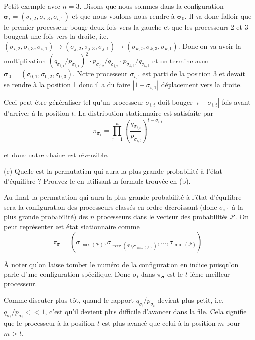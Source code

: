 \documentclass{article}
\begin{document}
Petit exemple avec $n=3$. Disons que nous sommes dans la configuration $\boldsymbol{\sigma}_i=(\sigma_{i,2},\sigma_{i,3},\sigma_{i,1})$ 
et que nous voulons nous rendre à $\boldsymbol{\sigma}_0$. Il va donc falloir que le premier processeur bouge deux fois vers la gauche
et que les processeurs 2 et 3 bougent une fois vers la droite, i.e. $(\sigma_{i,2},\sigma_{i,3},\sigma_{i,1})\to(\sigma_{j,2},\sigma_{j,3},\sigma_{j,1})\to(\sigma_{k,2},\sigma_{k,3},\sigma_{k,1})$. 
Donc on va avoir la multiplication $(q_{\sigma_{i,1}}/p_{\sigma_{i,1}})^2\cdot p_{\sigma_{j,2}}/q_{\sigma_{j,2}}\cdot p_{\sigma_{k,3}}/q_{\sigma_{k,3}}$ 
et on termine avec $\boldsymbol{\sigma}_0=(\sigma_{0,1},\sigma_{0,2},\sigma_{0,3})$. Notre processeur $\sigma_{i,1}$ 
est parti de la position 3 et devait se rendre à la position 1 donc il a du faire $|1-\sigma_{i,1}|$ déplacement vers la droite.

\vspace{.2cm}
Ceci peut être généraliser tel qu'un processeur $\sigma_{i,t}$ doit bouger $|t-\sigma_{i,t}|$ fois avant 
d'arriver à la position $t$. La distribution stationnaire est satisfaite par
\begin{equation}
    \pi_{\boldsymbol{\sigma}_i}=\prod_{t=1}^n \left(\frac{q_{\sigma_{i,t}}}{p_{\sigma_{i,t}}}\right)^{t-\sigma_{i,t}}
\end{equation}

et donc notre chaîne est réversible.

\vspace{.5cm}
\noindent (c) Quelle est la permutation qui aura la plus grande 
probabilité à l'état d'équilibre ? Prouvez-le en utilisant la formule
trouvée en (b).

\vspace{.2cm}
Au final, la permutation qui aura la plus grande probabilité à l'état d'équilibre sera
la configuration des processeurs classés en ordre décroissant (donc $\sigma_{i,1}$ à la plus grande probabilité) des 
$n$ processeurs dans le vecteur des probabilités $\mathcal{P}$. On peut représenter cet état stationnaire comme 
\[
    \pi_{\boldsymbol{\sigma}} = \left( \sigma_{\max(\mathcal{P})},\sigma_{\max(\mathcal{P} \setminus \sigma_{\max(\mathcal{P})} )},...,\sigma_{\min(\mathcal{P})} \right)
\]

À noter qu'on laisse tomber le numéro de la configuration en indice puisqu'on parle d'une configuration spécifique.
Donc $\sigma_{t}$ dans $\pi_{\boldsymbol{\sigma}}$ est le $t$-ième meilleur processeur.

\vspace{.2cm}
Comme discuter plus tôt, quand le rapport $q_{\sigma_t}/p_{\sigma_t}$ devient plus petit, i.e. $q_{\sigma_t}/p_{\sigma_t} <\!\!< 1$,
c'est qu'il devient plus difficile d'avancer dans la file. Cela signifie que le processeur à la position $t$ est 
plus avancé que celui à la position $m$ pour $m>t$.
\end{document}
